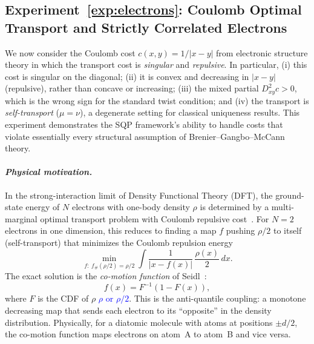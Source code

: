 \documentclass[12pt,leqno]{amsart}
\newcounter{experiment}
\newcommand{\zihe}[1]{\textcolor{blue}{#1}}
\begin{document}
\label{exp:electrons}
\subsection*{Experiment~\ref{exp:electrons}: Coulomb Optimal Transport and Strictly Correlated Electrons}\label{sec:exp-coulomb}

We now consider the Coulomb cost $c(x,y) = 1/|x-y|$ from electronic structure theory in which the transport cost is \emph{singular} and \emph{repulsive}. In particular, (i) this cost is singular on the diagonal; (ii) it is convex and decreasing in $|x-y|$ (repulsive), rather than concave or increasing; (iii) the mixed partial $D^2_{xy}c > 0$, which is the wrong sign for the standard twist condition; and (iv) the transport is \emph{self-transport} ($\mu = \nu$), a degenerate setting for classical uniqueness results. This experiment demonstrates the SQP framework's ability to handle costs that violate essentially every structural assumption of Brenier--Gangbo--McCann theory.   

\paragraph{\it Physical motivation.}
In the strong-interaction limit of Density Functional Theory (DFT), the ground-state energy of $N$ electrons with one-body density $\rho$ is determined by a multi-marginal optimal transport problem with Coulomb repulsive cost~\citep{Seidl1999,ButCDP2012,ColomboDeP2015}. For $N = 2$ electrons in one dimension, this reduces to finding a map $f$ pushing $\rho/2$ to itself (self-transport) that minimizes the Coulomb repulsion energy
\begin{equation}\label{eq:coulomb-sce}
    \min_{f:\; f_\#(\rho/2) = \rho/2} \int \frac{1}{|x - f(x)|}\,\frac{\rho(x)}{2}\,dx.
\end{equation}
The exact solution is the \emph{co-motion function} of Seidl~\citep{Seidl1999}:
\begin{equation}\label{eq:comotion}
    f(x) = F^{-1}(1 - F(x)),
\end{equation}
where $F$ is the CDF of $\rho$ \zihe{$\rho$ or $\rho/2$}. This is the anti-quantile coupling: a monotone decreasing map that sends each electron to its ``opposite'' in the density distribution. Physically, for a diatomic molecule with atoms at positions $\pm d/2$, the co-motion function maps electrons on atom~A to atom~B and vice versa.
\end{document}
